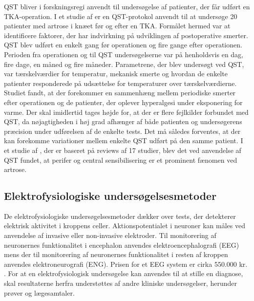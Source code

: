 QST bliver i forskningsregi anvendt til undersøgelse af patienter, der får udført en TKA-operation. I et studie af  er en QST-protokol anvendt til at undersøge 20 patienter med artrose i knæet før og efter en TKA. Formålet hermed var at identificere faktorer, der har indvirkning på udviklingen af postoperative smerter. QST blev udført en enkelt gang før operationen og fire gange efter operationen. Perioden fra operationen og til QST undersøgelserne var på henholdsvis en dag, fire dage, en måned og fire måneder. Parametrene, der blev undersøgt ved QST, var tærskelværdier for temperatur, mekanisk smerte og hvordan de enkelte patienter responderede på udsættelse for temperaturer over tærskelværdierne. Studiet fandt, at der forekommer en sammenhæng mellem periodiske smerter efter operationen og de patienter, der oplever hyperalgesi under eksponering for varme. \citep{Martinez2007} Der skal imidlertid tages højde for, at der er flere fejlkilder forbundet med QST, da nøjagtigheden i høj grad afhænger af både patienten og undersøgerens præcision under udførelsen af de enkelte tests. Det må således forventes, at der kan forekomme variationer mellem enkelte QST udført på den samme patient. \citep{Yarnitsky2006} I et studie af , der er baseret på reviews af 17 studier, blev det ved anvendelse af QST fundet, at perifer og central sensibilisering er et prominent fænomen ved artrose.

\subsection{Elektrofysiologiske undersøgelsesmetoder}
De elektrofysiologiske undersøgelsesmetoder dækker over tests, der detekterer elektrisk aktivitet i kroppens celler. Aktionspotentialet i neuroner kan måles ved anvendelse af invasive eller non-invasive elektroder. Til monitorering af neuronernes funktionalitet i encephalon anvendes elektroencephalografi (EEG) mens der til monitorering af neuronernes funktionalitet i resten af kroppen anvendes elektroneurografi (ENG). Prisen for et EEG system er cirka 550.000 kr. \citep{Biosemi2016}. For at en elektrofysiologisk undersøgelse kan anvendes til at stille en diagnose, skal resultaterne herfra understøttes af andre kliniske undersøgelser, herunder prøver og lægesamtaler. \citep{Robinson2008} 

